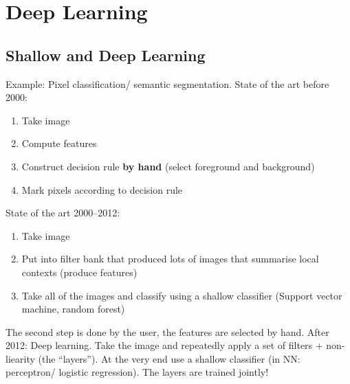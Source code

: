 \chapter{Deep Learning}%
\label{chap:03}

\section{Shallow and Deep Learning}
Example: Pixel classification/ semantic segmentation. State of the art
before 2000:
\begin{enumerate}
\item Take image
\item Compute features
\item Construct decision rule \textbf{by hand} (\eg select foreground
  and background)
\item Mark pixels according to decision rule
\end{enumerate}

State of the art 2000--2012:
\begin{enumerate}
\item Take image
\item Put into filter bank that produced lots of images that summarise
  local contexts (\ie produce features)
\item Take all of the images and classify using a shallow classifier
  (Support vector machine, random forest)
\end{enumerate}
The second step is done by the user, \ie the features are selected by
hand. After 2012: Deep learning.  Take the image and repeatedly apply
a set of filters + non-liearity (the ``layers''). At the very end use
a shallow classifier (in NN: perceptron/ logistic regression). The
layers are trained jointly!

